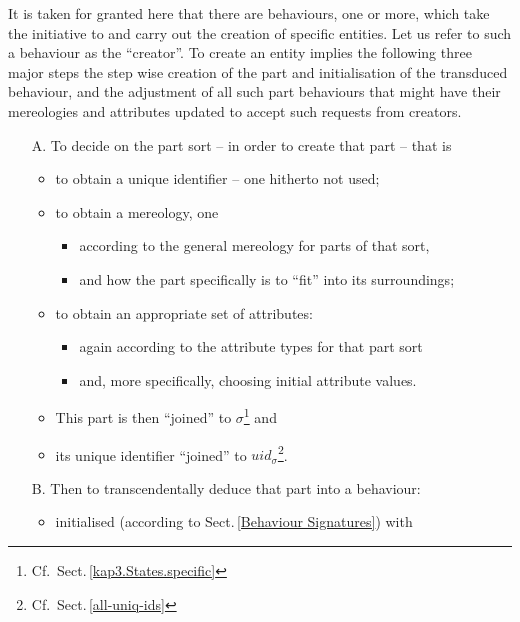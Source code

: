 \label{Create Entities}

\begynd
\pind It is taken for granted here that there are behaviours, \nyl one or more, which
      take the initiative to and carry out \nyl the creation of specific
      entities. \nyl Let us refer to such a behaviour as the ``creator''.
\pind To create an entity implies the following three major steps
\begynd
\pind {[A.--C.]} the step wise creation of the part \nyl and
                 initialisation of the transduced behaviour, and
\pind {[D.]} the adjustment of all such part behaviours that might
             have their mereologies and attributes updated to accept
             such requests from creators.
\afslut
\afslut
\mnewfoil
\begin{itemize}
\item[A.] To decide on the part sort -- in order to create that part -- that is
\begin{itemize}
\item to obtain a unique identifier -- one hitherto not used;
\item to obtain a mereology, one
\begin{itemize}
\item according to the general mereology for parts of that sort,
\item and how the part specifically is to ``fit'' into its surroundings;
\end{itemize}
\item to obtain an appropriate set of attributes:
\begin{itemize}
\item again according to the attribute types for that part sort
\item and, more specifically, choosing initial attribute
      values.
\end{itemize}
\item This part is then ``joined'' to 
      $\sigma$\footnote{\LLLL {} Cf.\ Sect.\,\vref{kap3.States.specific}}
      and 
\item its unique identifier ``joined'' to  ${uid}_{\sigma}$\footnote{\LLLL {} Cf.\
      Sect.\,\vref{all-uniq-ids}}. 
\end{itemize}
\mnewfoil
\item[B.] Then to transcendentally deduce that part into a behaviour:
\begin{itemize}
\item initialised (according to Sect.\,\ref{Behaviour Signatures}) with

\end{itemize}
\end{itemize}
